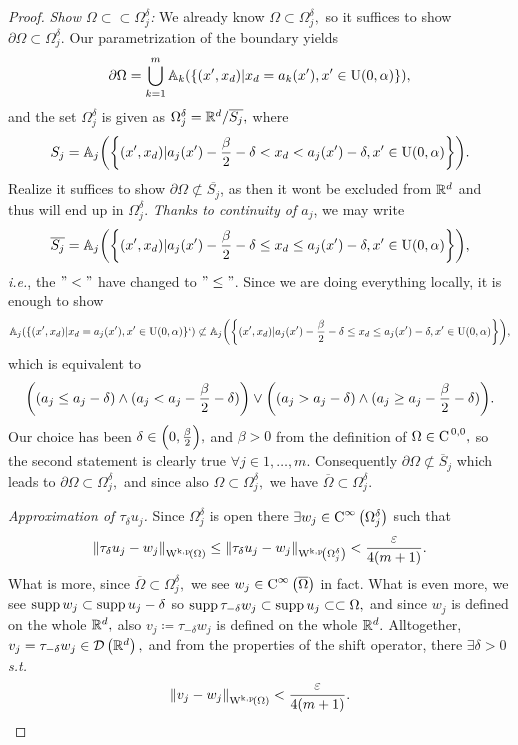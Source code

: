 \documentclass{article}
\begin{document}
\begin{proof}
\textit{Show $\Omega \subset \subset \Omega_j^{\delta}$:}
We already know $\Omega \subset \Omega_j^{\delta},$ so it suffices to show $\partial \Omega \subset \Omega_j^{\delta}.$ Our parametrization of the boundary yields
\[
	\partial \Omega = \bigcup_{k=1}^m \mathbb{A}_k\qty(\qty{(x',x_d)| x_d = a_k(x'), x' \in \text{U}(0,\alpha)}),
\]
and the set $\Omega_j^{\delta}$ is given as $\Omega_{j}^{\delta} = {\mathbb R}^{d} / \overline{S_j},$ where
\[
	S_j = \mathbb{A}_j\qty(\qty{(x',x_d)| a_j(x') - \frac{\beta}{2} - \delta < x_d < a_j(x') - \delta, x' \in \text{U}(0,\alpha)}).
\]
Realize it suffices to show $\partial \Omega \not \subset \overline{S_j}$, as then it wont be excluded from ${\mathbb R}^{d}$ and thus will end up in $\Omega_j^\delta.$ \textit{Thanks to continuity of $a_j$}, we may write
\[
	\overline{S_j} = \mathbb{A}_j\qty(\qty{(x',x_d)| a_j(x') - \frac{\beta}{2} - \delta \leq x_d \leq a_j(x') - \delta, x' \in \text{U}(0,\alpha)}),
\]
\textit{i.e.}, the $"<"$ have changed to $"\leq"$. Since we are doing everything locally, it is enough to show
\[
	\mathbb{A}_j\qty(\qty{(x',x_d)|x_d = a_j(x'), x' \in \text{U}(0,\alpha)}`) \not \subset \mathbb{A}_j\qty(\qty{(x',x_d)| a_j(x') - \frac{\beta}{2} - \delta \leq x_d \leq a_j(x') - \delta, x' \in \text{U}(0,\alpha)}),
\]
which is equivalent to
\[
	\qty((a_j \leq a_j - \delta) \wedge (a_j < a_j - \frac{\beta}{2} - \delta)) \vee \qty((a_j > a_j - \delta) \wedge (a_j \geq a_j - \frac{\beta}{2} - \delta)).
\]
Our choice has been $\delta \in \qty(0, \frac{\beta}{2}),$ and $\beta > 0$ from the definition of $\Omega \in \text{C}^{\!\,\, 0,0},$ so the second statement is clearly true $\forall j \in {1, \dots, m}$. Consequently $\partial \Omega \not \subset \overline{S}_j$ which leads to $\partial \Omega \subset \Omega_j^{\delta},$ and since also $\Omega \subset \Omega_j^{\delta},$ we have $\overline{\Omega} \subset \Omega_j^{\delta}.$

\textit{Approximation of $\tau_{\delta}u_j$.}
Since $\Omega_{j}^\delta$ is open there $\exists w_j \in \text{C}^{\infty}\!\,\left(\Omega_j^{\delta} \right)$ such that
\[
	\norm{\tau_{\delta}u_j - w_j}_{\WkpSet{\Omega}} \leq \norm{\tau_{\delta}u_j - w_j}_{\WkpSet{\Omega_{j}^\delta}} < \frac{\varepsilon}{4(m+1)}.
\]
What is more, since $\overline{\Omega} \subset \Omega_j^{\delta},$ we see $w_j \in \text{C}^{\infty}\!\,\left(\overline{\Omega} \right)$ in fact. What is even more, we see $\operatorname{supp} w_j \subset \operatorname{supp} u_j - \delta$ so $\operatorname{supp} \tau_{-\delta} w_j \subset \operatorname{supp} u_j \subset \subset \Omega,$ and since $w_j$ is defined on the whole ${\mathbb R}^{d},$ also $v_j \coloneq \tau_{-\delta}w_j$ is defined on the whole ${\mathbb R}^{d}.$ Alltogether, $v_j = \tau_{-\delta}w_j \in \mathcal{D}\!\,\left({\mathbb R}^{d} \right),$ and from the properties of the shift operator, there $\exists \delta >0$ \textit{s.t.}
\[
	\norm{v_j - w_j}_{\WkpSet{\Omega}} < \frac{\varepsilon}{4\qty(m+1)}.
\]



\end{proof}
\end{document}
